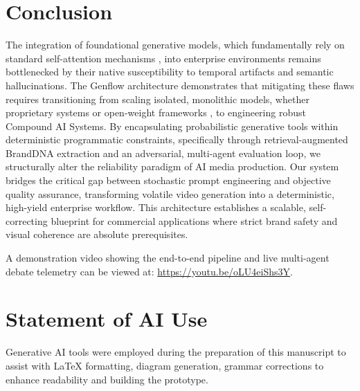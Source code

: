 \documentclass[sigconf,authordraft]{acmart}
\begin{document}
\section{Conclusion}

The integration of foundational generative models, which fundamentally rely on standard self-attention mechanisms \cite{vaswani2017attention}, into enterprise environments remains bottlenecked by their native susceptibility to temporal artifacts and semantic hallucinations. The Genflow architecture demonstrates that mitigating these flaws requires transitioning from scaling isolated, monolithic models, whether proprietary systems \cite{openai2023gpt4} or open-weight frameworks \cite{touvron2023llama}, to engineering robust Compound AI Systems. By encapsulating probabilistic generative tools within deterministic programmatic constraints, specifically through retrieval-augmented BrandDNA extraction and an adversarial, multi-agent evaluation loop, we structurally alter the reliability paradigm of AI media production. Our system bridges the critical gap between stochastic prompt engineering and objective quality assurance, transforming volatile video generation into a deterministic, high-yield enterprise workflow. This architecture establishes a scalable, self-correcting blueprint for commercial applications where strict brand safety and visual coherence are absolute prerequisites.

A demonstration video showing the end-to-end pipeline and live multi-agent debate telemetry can be viewed at: \url{https://youtu.be/oLU4eiShs3Y}.

\section*{Statement of AI Use}

Generative AI tools were employed during the preparation of this manuscript to assist with LaTeX formatting, diagram generation, grammar corrections to enhance readability and building the prototype.
\end{document}
